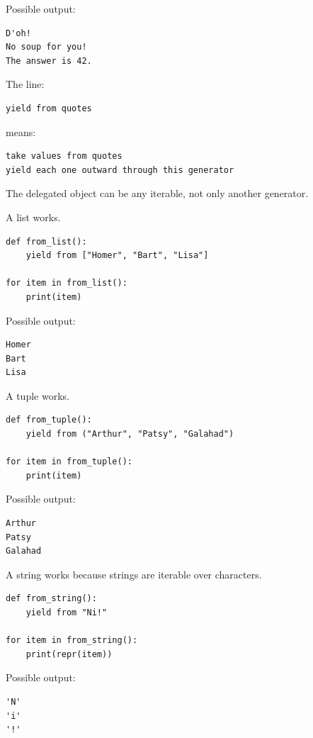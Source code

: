 Possible output:

\begin{verbatim}
D'oh!
No soup for you!
The answer is 42.
\end{verbatim}

The line:

\begin{verbatim}
yield from quotes
\end{verbatim}

means:

\begin{verbatim}
take values from quotes
yield each one outward through this generator
\end{verbatim}

The delegated object can be any iterable, not only another generator.

A list works.

\begin{verbatim}
def from_list():
    yield from ["Homer", "Bart", "Lisa"]

for item in from_list():
    print(item)
\end{verbatim}

Possible output:

\begin{verbatim}
Homer
Bart
Lisa
\end{verbatim}

A tuple works.

\begin{verbatim}
def from_tuple():
    yield from ("Arthur", "Patsy", "Galahad")

for item in from_tuple():
    print(item)
\end{verbatim}

Possible output:

\begin{verbatim}
Arthur
Patsy
Galahad
\end{verbatim}

A string works because strings are iterable over characters.

\begin{verbatim}
def from_string():
    yield from "Ni!"

for item in from_string():
    print(repr(item))
\end{verbatim}

Possible output:

\begin{verbatim}
'N'
'i'
'!'
\end{verbatim}

